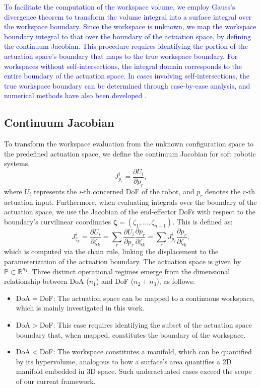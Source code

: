 \documentclass[journal]{IEEEtran}
\theoremstyle{definition}
\begin{document}
\textcolor{blue}{To facilitate the computation of the workspace volume, we employ Gauss's divergence theorem to transform the volume integral into a surface integral over the workspace boundary. Since the workspace is unknown, we map the workspace boundary integral to that over the boundary of the actuation space, by defining the continuum Jacobian. This procedure requires identifying the portion of the actuation space's boundary that maps to the true workspace boundary. For workspaces without self-intersections, the integral domain corresponds to the entire boundary of the actuation space. In cases involving self-intersections, the true workspace boundary can be determined through case-by-case analysis, and numerical methods have also been developed \cite{amehri_tel_04028186, Walid_Zheng_Kruszewski_Renda_2022}.}

\subsection{ Continuum Jacobian}
To transform the workspace evaluation from the unknown configuration space to the predefined actuation space, we define the continuum Jacobian for soft robotic systems,
\begin{equation}
  J^i_{p_r} = \frac{\partial U_i}{\partial p_r},
\end{equation}
where \( U_i \) represents the \( i \)-th concerned DoF of the robot, and \( p_r \) denotes the \( r \)-th actuation input. Furthermore, when evaluating integrals over the boundary of the actuation space, we use the Jacobian of the end-effector DoFs with respect to the boundary's curvilinear coordinates $\boldsymbol{\zeta} = (\zeta_1, \dots, \zeta_{n-1})$. This is defined as:
\begin{equation}
  J^i_{\zeta_k} = \frac{\partial U_i}{\partial \zeta_k} = \sum_r \frac{\partial U_i}{\partial p_r} \frac{\partial p_r}{\partial \zeta_k} = \sum_r J^i_{p_r} \frac{\partial p_r}{\partial \zeta_k},
\end{equation}
which is computed via the chain rule, linking the displacement to the parameterization of the actuation boundary. The actuation space is given by $\mathbb{P} \subset \mathbb{R}^{n_1}$. Three distinct operational regimes emerge from the dimensional relationship between DoA ($n_1$) and DoF ($n_2+n_3$), as follows:
\begin{itemize}
    \item DoA$=$DoF: The actuation space can be mapped to a continuous workspace, which is mainly investigated in this work.
    \item DoA$>$DoF: This case requires identifying the subset of the actuation space boundary \cite{amehri_tel_04028186} that, when mapped, constitutes the boundary of the workspace.
    \item DoA$<$DoF: The workspace constitutes a manifold, which can be quantified by its hypervolume, analogous to how a surface's area quantifies a 2D manifold embedded in 3D space. Such underactuated cases exceed the scope of our current framework. 
\end{itemize}
\end{document}
